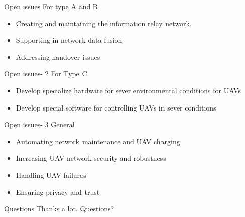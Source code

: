 \documentclass[unknownkeysallowed]{beamer}
\begin{document}
\begin{frame}{Open issues}
	For type A and B
	\begin{itemize}
		\item Creating and maintaining the information relay network.
		\item Supporting in-network data fusion
		\item Addressing handover issues
	\end{itemize}
\end{frame}

\begin{frame}{Open issues- 2}
	For Type C
	\begin{itemize}
		\item Develop specialize hardware for sever environmental conditions for UAVs
		\item Develop special software for controlling UAVs in sever conditions
	\end{itemize}
\end{frame}

\begin{frame}{Open issues- 3}
	General
	\begin{itemize}
		\item Automating network maintenance and UAV charging
		\item Increasing UAV network security and robustness
		\item Handling UAV failures
		\item Ensuring privacy and trust
	\end{itemize}
\end{frame}

\begin{frame}{Questions}
	Thanks a lot. Questions?
\end{frame}
\end{document}
